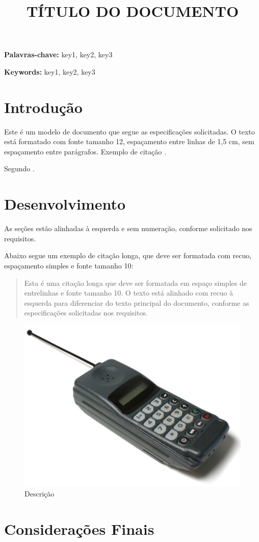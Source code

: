\documentclass{wticifes}
\begin{document}
\onehalfspacing

\title{TÍTULO DO DOCUMENTO}
\maketitle


\begin{resumo}
\lipsum[1]
\end{resumo}

\noindent\textbf{Palavras-chave:} key1, key2, key3

\vspace{0.5cm}
\begin{abstract}
\lipsum[1]
\end{abstract}

\noindent\textbf{Keywords:} key1, key2, key3

\section{Introdução}
Este é um modelo de documento que segue as especificações solicitadas. O texto está formatado com fonte tamanho 12, espaçamento entre linhas de 1,5 cm, sem espaçamento entre parágrafos. Exemplo de citação \cite{teste2023}.

Segundo .

\lipsum[1]

\section{Desenvolvimento}
As seções estão alinhadas à esquerda e sem numeração, conforme solicitado
nos requisitos.

\lipsum[1]

Abaixo segue um exemplo de citação longa, que deve ser formatada com recuo, espaçamento simples e fonte tamanho 10:

\begin{quote}
Esta é uma citação longa que deve ser formatada em espaço simples de entrelinhas e fonte tamanho 10. O texto está alinhado com recuo à esquerda para diferenciar do texto principal do documento, conforme as especificações solicitadas nos requisitos.
\end{quote}

\lipsum[3]

\begin{figure}
    \centering
    \includegraphics[width=0.5\linewidth]{img/img.jpg}
    \caption{Descrição}
    \label{fig:enter-label}
\end{figure}

\section{Considerações Finais}
\lipsum[2]

\end{document}
